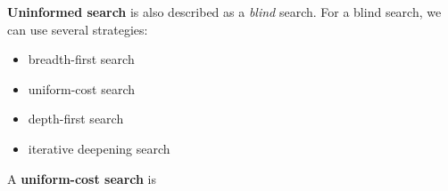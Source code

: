 \documentclass[12pt]{article}
\begin{document}
{\bf Uninformed search} is also described as a {\it blind} search. For a blind search, we can use several strategies:
\begin{itemize}
\item breadth-first search
\item uniform-cost search
\item depth-first search
\item iterative deepening search
\end{itemize}

A {\bf uniform-cost search} is
\end{document}
